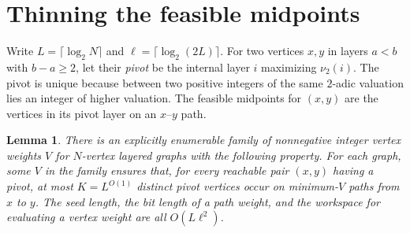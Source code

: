 \documentclass[11pt]{article}
\newtheorem{lemma}[theorem]{Lemma}
\begin{document}
\section{Thinning the feasible midpoints}

Write $L=\lceil\log_2 N\rceil$ and $\ell=\lceil\log_2(2L)\rceil$.
For two vertices $x,y$ in layers $a<b$ with $b-a\ge 2$, let their
\emph{pivot} be the internal layer $i$ maximizing $\nu_2(i)$.
The pivot is unique because between two positive integers of the same
$2$-adic valuation lies an integer of higher valuation. The feasible
midpoints for $(x,y)$ are the vertices in its pivot layer on an
$x$--$y$ path.

\begin{lemma}\label{lem:raw}
There is an explicitly enumerable family of nonnegative integer vertex
weights $V$ for $N$-vertex layered graphs with the following property.
For each graph, some $V$ in the family ensures that, for every reachable
pair $(x,y)$ having a pivot, at most $K=L^{O(1)}$ distinct pivot
vertices occur on minimum-$V$ paths from $x$ to $y$. The seed length,
the bit length of a path weight, and the workspace for evaluating a
vertex weight are all $O(L\ell^2)$.
\end{lemma}
\end{document}
